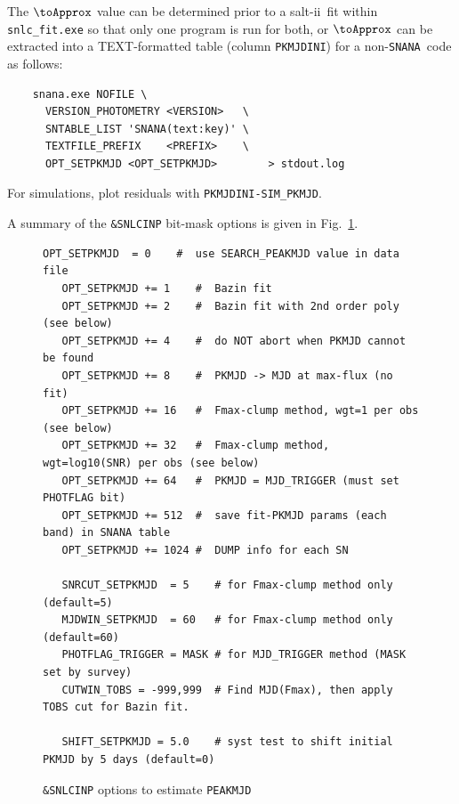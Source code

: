 \documentclass[12pt]{article}
\newcommand{\SALTII}{{\sc salt-ii}}
\newcommand{\SNANA}{{\tt SNANA}}
\begin{document}
The $\toApprox$ value can be determined prior to a \SALTII\ fit 
within {\tt snlc\_fit.exe} so that only one program is run for both,
or $\toApprox$ can be extracted into a TEXT-formatted table
(column {\tt PKMJDINI}) for a non-\SNANA\ code as follows:
%
\begin{verbatim}
    snana.exe NOFILE \
      VERSION_PHOTOMETRY <VERSION>   \
      SNTABLE_LIST 'SNANA(text:key)' \
      TEXTFILE_PREFIX    <PREFIX>    \  
      OPT_SETPKMJD <OPT_SETPKMJD>        > stdout.log
\end{verbatim}
%
For simulations, plot residuals with {\tt PKMJDINI-SIM\_PKMJD}.

A summary of the {\tt \&SNLCINP} bit-mask options is given in 
Fig.~\ref{fig:SETPKMJD}.
%
\begin{figure} [hb] 
\begin{center}
\caption{{\tt\&SNLCINP} options to estimate {\tt PEAKMJD}}
\label{fig:SETPKMJD}
\begin{Verbatim}[frame=single]
   OPT_SETPKMJD  = 0    #  use SEARCH_PEAKMJD value in data file
   OPT_SETPKMJD += 1    #  Bazin fit
   OPT_SETPKMJD += 2    #  Bazin fit with 2nd order poly (see below)
   OPT_SETPKMJD += 4    #  do NOT abort when PKMJD cannot be found
   OPT_SETPKMJD += 8    #  PKMJD -> MJD at max-flux (no fit)
   OPT_SETPKMJD += 16   #  Fmax-clump method, wgt=1 per obs (see below)
   OPT_SETPKMJD += 32   #  Fmax-clump method, wgt=log10(SNR) per obs (see below)
   OPT_SETPKMJD += 64   #  PKMJD = MJD_TRIGGER (must set PHOTFLAG bit)
   OPT_SETPKMJD += 512  #  save fit-PKMJD params (each band) in SNANA table
   OPT_SETPKMJD += 1024 #  DUMP info for each SN

   SNRCUT_SETPKMJD  = 5    # for Fmax-clump method only (default=5)
   MJDWIN_SETPKMJD  = 60   # for Fmax-clump method only (default=60)
   PHOTFLAG_TRIGGER = MASK # for MJD_TRIGGER method (MASK set by survey)
   CUTWIN_TOBS = -999,999  # Find MJD(Fmax), then apply TOBS cut for Bazin fit.

   SHIFT_SETPKMJD = 5.0    # syst test to shift initial PKMJD by 5 days (default=0)
\end{Verbatim}
\end{center}
\end{figure}
\end{document}
